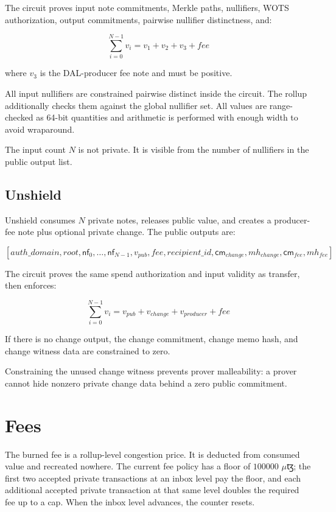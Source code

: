 \documentclass[11pt]{article}
\newcommand{\tez}{\ensuremath{\mathrm{\text{ꜩ}}}}
\newcommand{\mutez}{\ensuremath{\mu\tez}}
\newcommand{\cm}{\mathsf{cm}}
\newcommand{\nf}{\mathsf{nf}}
\begin{document}
The circuit proves input note commitments, Merkle paths, nullifiers, WOTS
authorization, output commitments, pairwise nullifier distinctness, and:

\[
\sum_{i=0}^{N-1} v_i = v_1 + v_2 + v_3 + fee
\]

where \(v_3\) is the DAL-producer fee note and must be positive.

All input nullifiers are constrained pairwise distinct inside the circuit. The
rollup additionally checks them against the global nullifier set. All values are
range-checked as 64-bit quantities and arithmetic is performed with enough
width to avoid wraparound.

The input count \(N\) is not private. It is visible from the number of
nullifiers in the public output list.

\subsection{Unshield}

Unshield consumes \(N\) private notes, releases public value, and creates a
producer-fee note plus optional private change. The public outputs are:

\[
[auth\_domain, root, \nf_0,\ldots,\nf_{N-1}, v_{pub}, fee,
recipient\_id, \cm_{change}, mh_{change}, \cm_{fee}, mh_{fee}]
\]

The circuit proves the same spend authorization and input validity as transfer,
then enforces:

\[
\sum_{i=0}^{N-1} v_i =
v_{pub} + v_{change} + v_{producer} + fee
\]

If there is no change output, the change commitment, change memo hash, and
change witness data are constrained to zero.

Constraining the unused change witness prevents prover malleability: a prover
cannot hide nonzero private change data behind a zero public commitment.

\section{Fees}

The burned fee is a rollup-level congestion price. It is deducted from consumed
value and recreated nowhere. The current fee policy has a floor of
\(100000\) \mutez{}; the first two accepted private transactions at an inbox
level pay the floor, and each additional accepted private transaction at that
same level doubles the required fee up to a cap. When the inbox level advances,
the counter resets.
\end{document}
